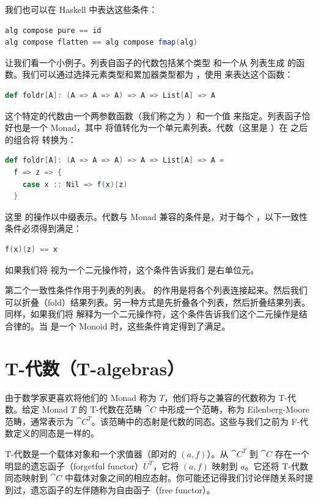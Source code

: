 \noindent
我们也可以在 Haskell 中表达这些条件：

\begin{lstlisting}[language=Scala]
alg compose pure == id
alg compose flatten == alg compose fmap(alg)
\end{lstlisting}
让我们看一个小例子。列表自函子的代数包括某个类型  和一个从  列表生成  的函数。我们可以通过选择元素类型和累加器类型都为 ，使用  来表达这个函数：

\begin{lstlisting}[language=Scala]
def foldr[A]: (A => A => A) => A => List[A] => A
\end{lstlisting}
这个特定的代数由一个两参数函数（我们称之为 ）和一个值  来指定。列表函子恰好也是一个 Monad，其中  将值转化为一个单元素列表。代数（这里是 ）在  之后的组合将  转换为：

\begin{lstlisting}[language=Scala]
def foldr[A]: (A => A => A) => A => List[A] => A =
  f => z => {
    case x :: Nil => f(x)(z)
  }
\end{lstlisting}
这里  的操作以中缀表示。代数与 Monad 兼容的条件是，对于每个 ，以下一致性条件必须得到满足：

\begin{lstlisting}[language=Scala]
f(x)(z) == x
\end{lstlisting}
如果我们将  视为一个二元操作符，这个条件告诉我们  是右单位元。

第二个一致性条件作用于列表的列表。  的作用是将各个列表连接起来。然后我们可以折叠（fold）结果列表。另一种方式是先折叠各个列表，然后折叠结果列表。同样，如果我们将  解释为一个二元操作符，这个条件告诉我们这个二元操作是结合律的。当  是一个 Monoid 时，这些条件肯定得到了满足。

\section{T-代数（T-algebras）}

由于数学家更喜欢将他们的 Monad 称为 $T$，他们将与之兼容的代数称为 T-代数。给定 Monad $T$ 的 T-代数在范畴 $\cat{C}$ 中形成一个范畴，称为 Eilenberg-Moore 范畴，通常表示为 $\cat{C}^T$。该范畴中的态射是代数的同态。这些与我们之前为 F-代数定义的同态是一样的。

T-代数是一个载体对象和一个求值器（即对的 $(a, f)$）。从 $\cat{C}^T$ 到 $\cat{C}$ 存在一个明显的遗忘函子（forgetful functor）$U^T$，它将 $(a, f)$ 映射到 $a$。它还将 T-代数同态映射到 $\cat{C}$ 中载体对象之间的相应态射。你可能还记得我们讨论伴随关系时提到过，遗忘函子的左伴随称为自由函子（free functor）。

